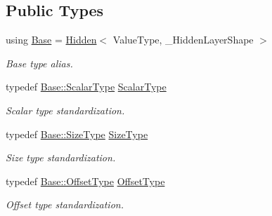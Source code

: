 \subsection*{Public Types}
\begin{DoxyCompactItemize}
\item 
using \hyperlink{classffnn_1_1layer_1_1_activation_a2f462178d98a5439e13962796c483459}{Base} = \hyperlink{classffnn_1_1layer_1_1_hidden}{Hidden}$<$ Value\-Type, \-\_\-\-Hidden\-Layer\-Shape $>$
\begin{DoxyCompactList}\small\item\em Base type alias. \end{DoxyCompactList}\item 
typedef \hyperlink{classffnn_1_1layer_1_1_layer_a3d482813f86f1ec69554b4592c478c32}{Base\-::\-Scalar\-Type} \hyperlink{classffnn_1_1layer_1_1_activation_a4ca1ce43c5be7e5b8950af7cb262daca}{Scalar\-Type}
\begin{DoxyCompactList}\small\item\em Scalar type standardization. \end{DoxyCompactList}\item 
typedef \hyperlink{classffnn_1_1layer_1_1_hidden_ac148012cb544a39841675601090cd4c8}{Base\-::\-Size\-Type} \hyperlink{classffnn_1_1layer_1_1_activation_a6a7b6dd86eb70b72a179ce9951fb1149}{Size\-Type}
\begin{DoxyCompactList}\small\item\em Size type standardization. \end{DoxyCompactList}\item 
typedef \hyperlink{classffnn_1_1layer_1_1_hidden_ae2409b970adafb0ebc9b2eec62c4aac4}{Base\-::\-Offset\-Type} \hyperlink{classffnn_1_1layer_1_1_activation_aac891b2d2a76bcf6035f53ed6abb94dc}{Offset\-Type}
\begin{DoxyCompactList}\small\item\em Offset type standardization. \end{DoxyCompactList}\end{DoxyCompactItemize}
